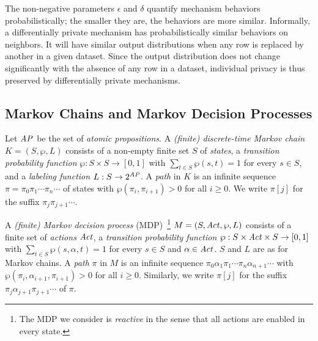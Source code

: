 The non-negative parameters $\epsilon$ and $\delta$ quantify
mechanism behaviors probabilistically;
the smaller they are, the behaviors are more similar.
Informally, a differentially private mechanism has probabilistically
similar behaviors on neighbors. It will have similar
output distributions when any row is replaced by another in a given
dataset. 
Since the output distribution does not change significantly with the
absence of any row in a dataset,
individual privacy is thus preserved by differentially private mechanisms.

\subsection{Markov Chains and Markov Decision Processes}

Let $\mathit{AP}$ be the set of \emph{atomic propositions}.
A \emph{(finite) discrete-time Markov chain} $K = (S, \wp, L)$ consists
of a non-empty finite set $S$ of \emph{states}, a \emph{transition
  probability function} $\wp : S \times S \rightarrow [0, 1]$ with
$\sum_{t \in S} \wp(s, t) = 1$ for every $s \in S$, and
a \emph{labeling function} $L : S \rightarrow 2^{\mathit{AP}}$. A \emph{path}
in $K$ is an infinite sequence $\pi = \pi_0 \pi_1 \cdots \pi_n \cdots$
of states with $\wp (\pi_i, \pi_{i+1}) > 0$ for all $i \geq 0$. We write
$\pi[j]$ for the suffix $\pi_j \pi_{j+1} \cdots$. %

A \emph{(finite) Markov decision process}
(MDP)~\footnote{The MDP we consider is \emph{reactive} in the sense that
all actions are enabled in every state.
}
$M = (S, \mathit{Act}, \wp, L)$ consists
of
a finite set of \emph{actions} $\mathit{Act}$,
a \emph{transition probability function} $\wp : S \times \mathit{Act}
\times S \rightarrow [0, 1]$ with $\sum_{t \in S} \wp(s, \alpha, t)
= 1$ for every $s \in S$ and $\alpha \in \mathit{Act}$. $S$ and
$L$ are as for Markov chains.
A \emph{path} $\pi$ in $M$ is an infinite sequence $\pi_0 \alpha_1
\pi_1 \cdots \pi_n \alpha_{n+1} \cdots$ with
$\wp(\pi_i, \alpha_{i+1}, \pi_{i+1}) > 0$ for all $i \geq 0$.
Similarly, we write $\pi[j]$ for the suffix $\pi_j \alpha_{j+1}
\pi_{j+1} \cdots$ of $\pi$.

